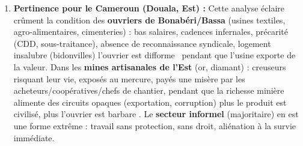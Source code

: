 \documentclass[11pt]{article}
\begin{document}
\begin{corrige}
\begin{enumerate}
\begin{itemize}
\item \textbf{Aliénation de l'acte de production (activité) :} \guillemotleft Plus le produit est formé, plus l'ouvrier est difforme. Plus le travail a de puissance, plus l'ouvrier est sans puissance. Plus le travail a d'esprit, plus l'ouvrier est sans esprit \guillemotright\ (l'activité est subie, non-libre, l'intelligence est dans la machine/capital, pas dans l'ouvrier).
\item \textbf{Aliénation de l'être d'espèce (Gattungswesen) :} \guillemotleft Plus le produit est civilisé, plus l'ouvrier est barbare \guillemotright\ (l'homme, être universel, libre, conscient, productif par nature, est réduit à une existence animale, barbare, unidimensionnelle).
\item \textbf{Aliénation de l'homme à l'homme :} \guillemotleft Plus il devient esclave de la nature \guillemotright\ (le rapport social est médiatisé par la chose/le capital ; l'ouvrier est esclave du capitaliste qui incarne le capital ; la société est déchirée en classes antagonistes).
\end{itemize}
\item \textbf{Pertinence pour le Cameroun (Douala, Est) :} Cette analyse éclaire crûment la condition des \textbf{ouvriers de Bonabéri/Bassa} (usines textiles, agro-alimentaires, cimenteries) : bas salaires, cadences infernales, précarité (CDD, sous-traitance), absence de reconnaissance syndicale, logement insalubre (bidonvilles) \guillemotleft l'ouvrier est difforme \guillemotright\ pendant que l'usine exporte de la valeur. Dans les \textbf{mines artisanales de l'Est} (or, diamant) : creuseurs risquant leur vie, exposés au mercure, payés une misère par les acheteurs/coopératives/chefs de chantier, pendant que la richesse minière alimente des circuits opaques (exportation, corruption) \guillemotleft plus le produit est civilisé, plus l'ouvrier est barbare \guillemotright. Le \textbf{secteur informel} (majoritaire) en est une forme extrême : travail sans protection, sans droit, aliénation à la survie immédiate.
\end{enumerate}
\end{corrige}
\end{document}
